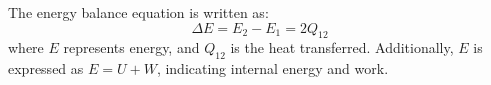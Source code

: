 The energy balance equation is written as:  
\[
\Delta E = E_2 - E_1 = 2 Q_{12}
\]  
where \( E \) represents energy, and \( Q_{12} \) is the heat transferred.  
Additionally, \( E \) is expressed as \( E = U + W \), indicating internal energy and work.